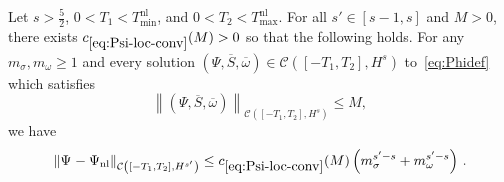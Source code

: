 \documentclass[AHL,Unicode,longabstracts,published]{cedram}
\newcommand{\nl}{\mathrm{nl}}
\newcommand{\cC}{\mathcal{C}}
\begin{document}
\begin{prop}\label{prop.conv}
Let $s>\tfrac52$, $0<T_1<T_{\min}^{\nl}$, and $0<T_2<T_{\max}^{\nl}$. For all $s'\in[s-1,s]$ and $M>0$, there exists $c_{\eqref{eq:Psi-loc-conv}}(M)>0$ so that the following holds. For any $m_\sigma, m_\omega\geq 1$ and every solution $(\Psi, \overline{S}, \overline{\omega})\in\cC([-T_1,T_2],H^s)$ to~\eqref{eq:Phidef} which satisfies
\begin{equation*}
\left\|(\Psi, \overline{S}, \overline{\omega})\right\|_{\cC\left([-T_1,T_2],H^s\right)}\leq M,
\end{equation*}
we have
\begin{equation}\label{eq:Psi-loc-conv}
\|\Psi_{{}}-\Psi_{\nl}\|_{\cC\left([-T_1,T_2],H^{s'}\right)}\leq c_{\eqref{eq:Psi-loc-conv}}(M)\left(m_\sigma^{s'-s}+m_{\omega}^{s'-s} \right)\,.
\end{equation}
\end{prop}
\end{document}
